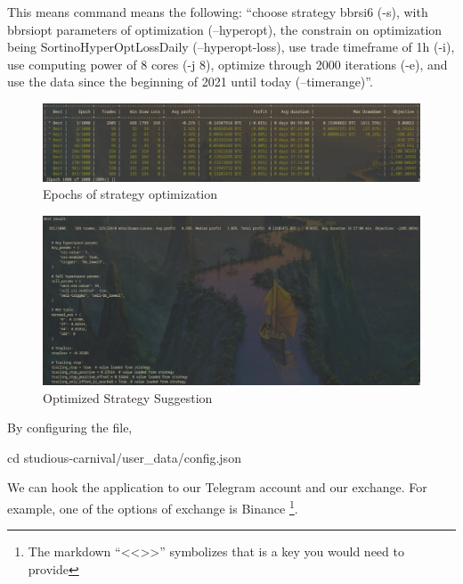 \documentclass[
12pt,				%
openright,			%
oneside,			%
a4paper,			%
brazil,				%
english,			  %
]{abntex2}
\begin{document}
This means command means the following: ``choose strategy bbrsi6 (-s), with bbrsiopt parameters of optimization (--hyperopt), the constrain on optimization being SortinoHyperOptLossDaily (--hyperopt-loss), use trade timeframe of 1h (-i), use computing power of 8 cores (-j 8), optimize through 2000 iterations (-e), and use the data since the beginning of 2021 until today (--timerange)''.

\begin{figure}[ht]
  \centering
    \caption{\label{fig:freqtrade-running} Epochs of strategy optimization}
  \includegraphics[width=\linewidth]{Imagens/freqtrade2.jpeg}
\end{figure}
\begin{figure}[ht]
  \centering
    \caption{\label{fig:freqtrade-running} Optimized Strategy Suggestion}
  \includegraphics[width=\linewidth]{Imagens/freqtrade3.jpeg}
\end{figure}

By configuring the file,
\begin{shell}
cd studious-carnival/user_data/config.json
\end{shell}

We can hook the application to our Telegram account and our exchange. For example, one of the options of exchange is Binance \footnote{The markdown ``<<>>'' symbolizes that is a key you would need to provide}.
\end{document}
